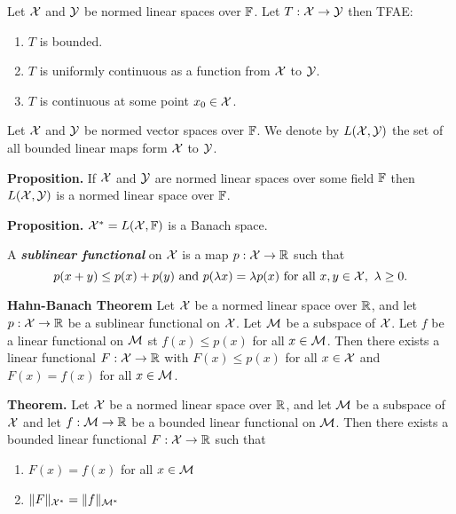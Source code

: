 \vs

\begin{prop}
Let $\mathcal{X}$ and $\mathcal{Y}$ be normed linear spaces over $\mathbb{F}$. Let $T:\mathcal{X}\rightarrow \mathcal{Y}$ then TFAE:
\begin{enumerate}
    \item $T$ is bounded.
    \item $T$ is uniformly continuous as a function from $\mathcal{X}$ to $\mathcal{Y}$.
    \item $T$ is continuous at some point $x_0\in \mathcal{X}$.
\end{enumerate}
\end{prop}

\vs

\dfn Let $\mathcal{X}$ and $\mathcal{Y}$ be normed vector spaces over $\mathbb{F}$. We denote by $L(\mathcal{X},\mathcal{Y})$ the set of all bounded linear maps form $\mathcal{X}$ to $\mathcal{Y}$.

\vs

\textbf{Proposition.} If $\mathcal{X}$ and $\mathcal{Y}$ are normed linear spaces over some field $\mathbb{F}$ then $L(\mathcal{X},\mathcal{Y})$ is a normed linear space over $\mathbb{F}$.

\vs

\textbf{Proposition.} $\mathcal{X}^* = L(\mathcal{X}, \mathbb{F})$ is a Banach space.

\vs

\dfn A \textbf{\textit{sublinear functional}} on $\mathcal{X}$ is a map $p:\mathcal{X}\rightarrow \mathbb{R}$ such that 
\[p(x + y) \leq p(x) + p(y)\text{ and } p(\lambda x) = \lambda p(x)\text{ for all $x,y\in\mathcal{X},\ \lambda \geq 0$}.\]

\vs

\textbf{Hahn-Banach Theorem} Let $\mathcal{X}$ be a normed linear space over $\mathbb{R}$, and let $p:\mathcal{X}\rightarrow \mathbb{R}$ be a sublinear functional on $\mathcal{X}$. Let $\mathcal{M}$ be a subspace of $\mathcal{X}$. Let $f$ be a linear functional on $\mathcal{M}$ st $f(x) \leq p(x)$ for all $x\in \mathcal{M}$. Then there exists a linear functional $F:\mathcal{X}\rightarrow \mathbb{R}$ with $F(x)\leq p(x)$ for all $x\in \mathcal{X}$ and $F(x) = f(x)$ for all $x\in \mathcal{M}$.

\vs

\textbf{Theorem.} Let $\mathcal{X}$ be a normed linear space over $\mathbb{R}$, and let $\mathcal{M}$ be a subspace of $\mathcal{X}$ and let $f:\mathcal{M}\rightarrow \mathbb{R}$ be a bounded linear functional on $\mathcal{M}$. Then there exists a bounded linear functional $F:\mathcal{X}\rightarrow \mathbb{R}$ such that 
\begin{enumerate}
    \item $F(x) = f(x)$ for all  $x\in \mathcal{M}$ 
    \item $\|F\|_{\mathcal{X}^*} = \|f\|_{\mathcal{M}^*}$
\end{enumerate}

